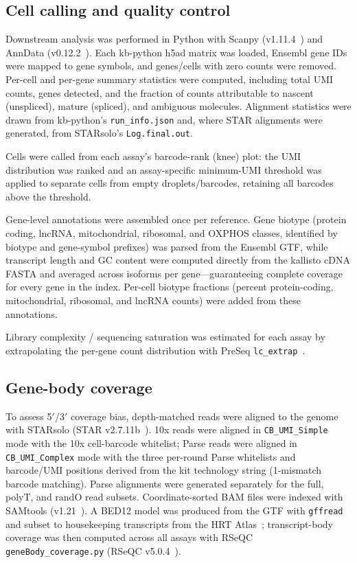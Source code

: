 \subsection{Cell calling and quality control}

Downstream analysis was performed in Python with Scanpy
(v1.11.4~\cite{wolf2018scanpy}) and AnnData (v0.12.2~\cite{virshup2024anndata}). Each
kb-python h5ad matrix was loaded, Ensembl gene IDs were mapped to
gene symbols, and genes/cells with zero counts were removed. Per-cell and per-gene
summary statistics were computed, including total UMI counts, genes detected, and
the fraction of counts attributable to nascent (unspliced), mature (spliced), and
ambiguous molecules. Alignment statistics were drawn from kb-python's
\texttt{run\_info.json} and, where STAR alignments were generated, from STARsolo's
\texttt{Log.final.out}.

Cells were called from each assay's barcode-rank (knee) plot: the UMI distribution
was ranked and an assay-specific minimum-UMI threshold was applied to separate cells
from empty droplets/barcodes, retaining all barcodes above the threshold.

Gene-level annotations were assembled once per reference. Gene biotype (protein
coding, lncRNA, mitochondrial, ribosomal, and OXPHOS classes, identified by biotype
and gene-symbol prefixes) was parsed from the Ensembl GTF, while transcript length
and GC content were computed directly from the kallisto cDNA FASTA and averaged
across isoforms per gene---guaranteeing complete coverage for every gene in the
index. Per-cell biotype fractions (percent protein-coding, mitochondrial,
ribosomal, and lncRNA counts) were added from these annotations.

Library complexity / sequencing saturation was estimated for each assay by
extrapolating the per-gene count distribution with PreSeq
\texttt{lc\_extrap}~\cite{daley2013preseq}.

\subsection{Gene-body coverage}

To assess 5$'$/3$'$ coverage bias, depth-matched reads were aligned to the genome
with STARsolo (STAR v2.7.11b~\cite{dobin2013star}). 10x reads were aligned in
\texttt{CB\_UMI\_Simple}
mode with the 10x cell-barcode whitelist; Parse reads were aligned in
\texttt{CB\_UMI\_Complex} mode with the three per-round Parse whitelists and
barcode/UMI positions derived from the kit technology string (1-mismatch barcode
matching). Parse alignments were generated separately for the full, polyT, and randO
read subsets. Coordinate-sorted BAM files were indexed with SAMtools
(v1.21~\cite{danecek2021samtools}). A BED12 model was produced from the GTF with
\texttt{gffread}~\cite{pertea2020gffread} and subset to housekeeping transcripts from
the HRT Atlas~\cite{hounkpe2021hrt}; transcript-body coverage was then computed across
all assays with RSeQC \texttt{geneBody\_coverage.py} (RSeQC v5.0.4~\cite{wang2012rseqc}).

